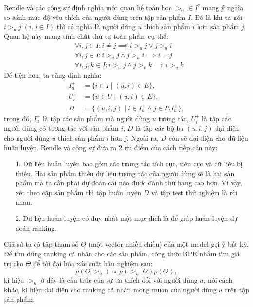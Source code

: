 Rendle và các cộng sự \cite{BPR-loss} định nghĩa một quan hệ toán học $>_u \in I^2$ mang ý nghĩa so sánh mức độ yêu thích của người dùng trên tập sản phẩm $I$. Đó là khi ta nói \(i >_u j\; (i, j \in I)\) thì có nghĩa là người dùng $u$ thích sản phẩm $i$ hơn sản phẩm $j$. Quan hệ này mang tính chất thứ tự toàn phần, cụ thể:
\begin{align*}
    & \forall i, j \in I: i \neq j \implies i >_u j \lor j >_u i \tag{toàn phần} \\
    & \forall i, j \in I: i >_u j \land j >_u i \implies i = j \tag{phi đối xứng} \\
    & \forall i, j, k \in I: i >_u j \land j >_u k \implies i >_u k \tag{bắc cầu}
\end{align*}
Để tiện hơn, ta cũng định nghĩa:
\begin{equation}
    \begin{aligned}
        I_u^+ & = \{i \in I \; | \; (u, i) \in E\}, \\
        U_i^+ & = \{u \in U \; | \; (u, i) \in E\}, \\
        D & = \{(u, i, j) \; | \; i \in I_u^+ \land j \in I \setminus I_u^+\},
    \end{aligned}
\end{equation}
trong đó, $I_u^+$ là tập các sản phẩm mà người dùng $u$ tương tác, $U_i^+$ là tập các người dùng có tương tác với sản phẩm $i$, $D$ là tập các bộ ba $(u, i, j)$ đại diện cho người dùng $u$ thích sản phẩm $i$ hơn $j$. Ngoài ra, $D$ còn sẽ đại diện cho dữ liệu huấn luyện. Rendle và công sự đưa ra 2 ưu điểm \cite{BPR-loss} của cách tiếp cận này:
\begin{itemize}
    \item[1.] Dữ liệu huấn luyện bao gồm các tương tác tích cực, tiêu cực và dữ liệu bị thiếu. Hai sản phẩm thiếu dữ liệu tương tác của người dùng sẽ là hai sản phẩm mà ta cần phải dự đoán cái nào được đánh thứ hạng cao hơn. Vì vậy, xét theo cặp sản phẩm thì tập huấn luyện $D$ và tập test thử nghiệm là rời nhau.

    \item[2.] Dữ liệu huấn luyện có duy nhất một mục đích là để giúp huấn luyện dự đoán ranking.
\end{itemize}

Giả sử ta có tập tham số $\Theta$ (một vector nhiều chiều) của một model gợi ý bất kỳ. Để tìm đúng ranking cá nhân cho các sản phẩm, công thức BPR nhắm tìm giá trị cho $\Theta$ để tối đại hóa xác suất hậu nghiệm sau:
\begin{equation}
    p(\Theta | >_u) \propto p(>_u | \Theta) p(\Theta),
\end{equation}
kí hiệu $>_u$ ở đây là cấu trúc của sự ưa thích đối với người dùng $u$, nói cách khác, kí hiệu đại diện cho ranking cá nhân mong muốn của người dùng $u$ trên tập sản phẩm.

